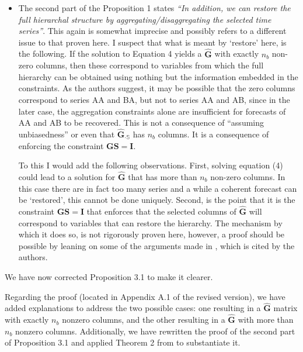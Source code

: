 \documentclass[11pt,a4paper,]{article}
\renewenvironment{quote}
               {\list{}{\rightmargin\leftmargin}%
                \item\relax\color[RGB]{0,150,0}}
               {\endlist}
\begin{document}
\begin{itemize}
\item
  The second part of the Proposition 1 states \emph{``In addition, we
  can restore the full hierarchal structure by
  aggregating/disaggregating the selected time series''}. This again is
  somewhat imprecise and possibly refers to a different issue to that
  proven here. I suspect that what is meant by `restore' here, is the
  following. If the solution to Equation 4 yields a \(\hat{\bm{G}}\)
  with exactly \(n_b\) non-zero columns, then these correspond to
  variables from which the full hierarchy can be obtained using nothing
  but the information embedded in the constraints. As the authors
  suggest, it may be possible that the zero columns correspond to series
  AA and BA, but not to series AA and AB, since in the later case, the
  aggregation constraints alone are insufficient for forecasts of AA and
  AB to be recovered. This is not a consequence of ``assuming
  unbiasedness'' or even that \(\hat{\bm{G}}_{\cdot \mathbb{S}}\) has
  \(n_b\) columns. It is a consequence of enforcing the constraint
  \(\bm{GS}=\bm{I}\).

  To this I would add the following observations. First, solving
  equation (4) could lead to a solution for \(\hat{\bm{G}}\) that has
  more than \(n_b\) non-zero columns. In this case there are in fact too
  many series and a while a coherent forecast can be `restored', this
  cannot be done uniquely. Second, is the point that it is the
  constraint \(\bm{GS}=\bm{I}\) that enforces that the selected columns
  of \(\hat{\bm{G}}\) will correspond to variables that can restore the
  hierarchy. The mechanism by which it does so, is not rigorously proven
  here, however, a proof should be possible by leaning on some of the
  arguments made in \textcite{Zhang2023-op}, which is cited by the
  authors.
\end{itemize}

\begin{quote}
We have now corrected Proposition 3.1 to make it clearer.

Regarding the proof (located in Appendix A.1 of the revised version), we
have added explanations to address the two possible cases: one resulting
in a \(\hat{\bm{G}}\) matrix with exactly \(n_b\) nonzero columns, and
the other resulting in a \(\hat{\bm{G}}\) with more than \(n_b\) nonzero
columns. Additionally, we have rewritten the proof of the second part of
Proposition 3.1 and applied Theorem 2 from \textcite{Zhang2023-op} to
substantiate it.
\end{quote}
\end{document}
